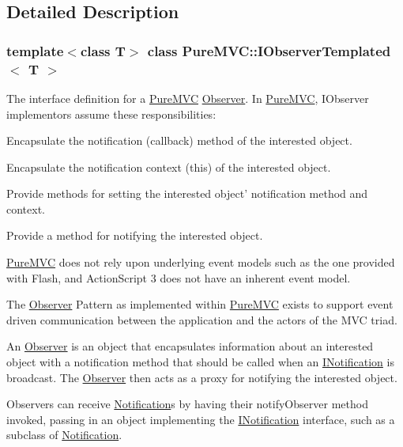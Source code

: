 \subsection{Detailed Description}
\subsubsection*{template$<$class T$>$ class PureMVC::IObserverTemplated$<$ T $>$}

The interface definition for a \hyperlink{namespace_pure_m_v_c}{PureMVC} \hyperlink{class_pure_m_v_c_1_1_observer}{Observer}. In \hyperlink{namespace_pure_m_v_c}{PureMVC}, {\ttfamily IObserver} implementors assume these responsibilities: 
\begin{DoxyItemize}
\item Encapsulate the notification (callback) method of the interested object. 
\item Encapsulate the notification context (this) of the interested object. 
\item Provide methods for setting the interested object' notification method and context. 
\item Provide a method for notifying the interested object. 
\end{DoxyItemize}

\hyperlink{namespace_pure_m_v_c}{PureMVC} does not rely upon underlying event models such as the one provided with Flash, and ActionScript 3 does not have an inherent event model.

The \hyperlink{class_pure_m_v_c_1_1_observer}{Observer} Pattern as implemented within \hyperlink{namespace_pure_m_v_c}{PureMVC} exists to support event driven communication between the application and the actors of the MVC triad.

An \hyperlink{class_pure_m_v_c_1_1_observer}{Observer} is an object that encapsulates information about an interested object with a notification method that should be called when an \hyperlink{class_pure_m_v_c_1_1_i_notification}{INotification} is broadcast. The \hyperlink{class_pure_m_v_c_1_1_observer}{Observer} then acts as a proxy for notifying the interested object.

Observers can receive {\ttfamily \hyperlink{class_pure_m_v_c_1_1_notification}{Notification}}s by having their {\ttfamily notifyObserver} method invoked, passing in an object implementing the {\ttfamily \hyperlink{class_pure_m_v_c_1_1_i_notification}{INotification}} interface, such as a subclass of {\ttfamily \hyperlink{class_pure_m_v_c_1_1_notification}{Notification}}.

